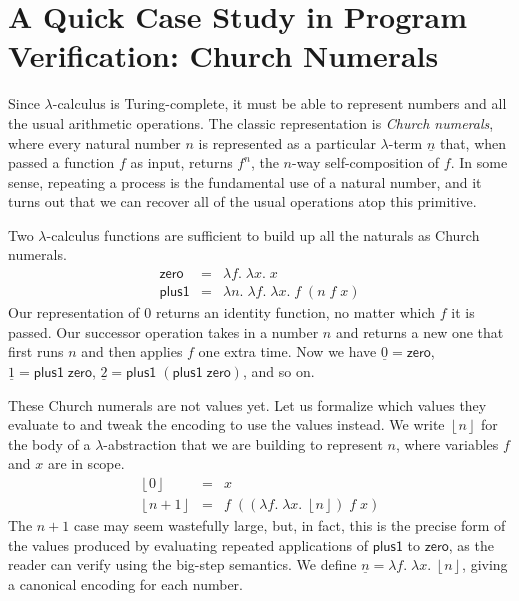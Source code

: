 \documentclass{amsbook}
\theoremstyle{definition}
\theoremstyle{remark}
\numberwithin{section}{chapter}
\numberwithin{equation}{chapter}
\begin{document}
\section{A Quick Case Study in Program Verification: Church Numerals}

\newcommand{\church}[1]{\underline{#1}}

Since $\lambda$-calculus is Turing-complete, it must be able to represent numbers and all the usual arithmetic operations.
The classic representation is \emph{Church numerals}, where every natural number $n$ is represented as a particular $\lambda$-term $\church{n}$ that, when passed a function $f$ as input, returns $f^n$, the $n$-way self-composition of $f$.
In some sense, repeating a process is the fundamental use of a natural number, and it turns out that we can recover all of the usual operations atop this primitive.

\newcommand{\lc}[1]{\mathsf{#1}}

Two $\lambda$-calculus functions are sufficient to build up all the naturals as Church numerals.
\begin{eqnarray*}
  \lc{zero} &=& \lambda f. \; \lambda x. \; x \\
  \lc{plus1} &=& \lambda n. \; \lambda f. \; \lambda x. \; f \; (n \; f \; x)
\end{eqnarray*}
Our representation of 0 returns an identity function, no matter which $f$ it is passed.
Our successor operation takes in a number $n$ and returns a new one that first runs $n$ and then applies $f$ one extra time.
Now we have $\church{0} = \lc{zero}$, $\church{1} = \lc{plus1} \; \lc{zero}$, $\church{2} = \lc{plus1} \; (\lc{plus1} \; \lc{zero})$, and so on.

\newcommand{\prechurch}[1]{\left \lfloor #1 \right \rfloor}

These Church numerals are not values yet.
Let us formalize which values they evaluate to and tweak the encoding to use the values instead.
We write $\prechurch{n}$ for the body of a $\lambda$-abstraction that we are building to represent $n$, where variables $f$ and $x$ are in scope.
\begin{eqnarray*}
  \prechurch{0} &=& x \\
  \prechurch{n+1} &=& f \; ((\lambda f. \; \lambda x. \; \prechurch{n}) \; f \; x)
\end{eqnarray*}
The $n+1$ case may seem wastefully large, but, in fact, this is the precise form of the values produced by evaluating repeated applications of $\lc{plus1}$ to $\lc{zero}$, as the reader can verify using the big-step semantics.
We define $\church{n} = \lambda f. \; \lambda x. \; \prechurch{n}$, giving a canonical encoding for each number.
\end{document}
